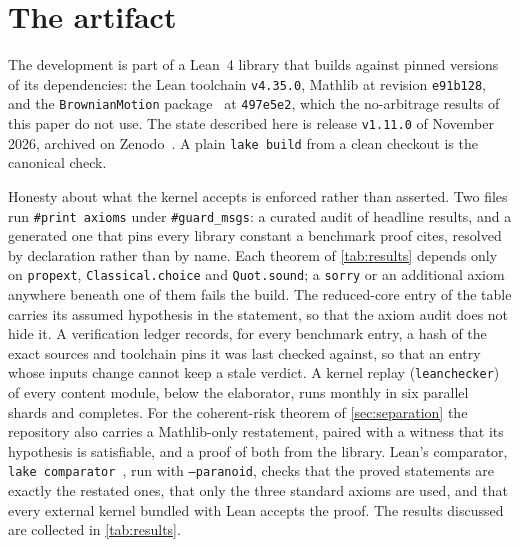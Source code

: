 \documentclass[11pt]{article}
\begin{document}
\section{The artifact}\label{sec:artifact}

The development is part of a Lean~4 library that builds against pinned versions of its dependencies:
the Lean toolchain \texttt{v4.35.0}, Mathlib at revision \texttt{e91b128}, and the
\texttt{BrownianMotion} package~\cite{BrownianMotionRepo} at \texttt{497e5e2}, which the no-arbitrage results of this
paper do not use. The state described here is release \texttt{v1.11.0} of November 2026,
archived on Zenodo~\cite{Zenodo}. A plain \texttt{lake build} from a clean checkout is the canonical
check.

Honesty about what the kernel accepts is enforced rather than asserted. Two files run
\texttt{\#print axioms} under \texttt{\#guard\_msgs}: a curated audit of headline results, and a generated one
that pins every library constant a benchmark proof cites, resolved by declaration rather than by name.
Each theorem of \cref{tab:results} depends only on \texttt{propext}, \texttt{Classical.choice} and
\texttt{Quot.sound}; a \texttt{sorry} or an additional axiom anywhere beneath one of them fails the build. The
reduced-core entry of the table carries its assumed hypothesis in the statement, so that the axiom audit does not hide it.
A verification ledger records, for every benchmark entry, a hash of the exact sources and toolchain pins it
was last checked against, so that an entry whose inputs change cannot keep a stale verdict. A kernel replay
(\texttt{leanchecker}) of every content module, below the elaborator, runs monthly in six parallel shards and completes.
For the coherent-risk theorem of \cref{sec:separation} the repository also carries a Mathlib-only restatement,
paired with a witness that its hypothesis is satisfiable, and a proof of both from the library. Lean's comparator,
\texttt{lake comparator}~\cite{Comparator}, run with \texttt{--paranoid}, checks that the proved statements are exactly the restated ones, that only the
three standard axioms are used, and that every external kernel bundled with Lean accepts the proof. The results discussed are collected in
\cref{tab:results}.
\end{document}
